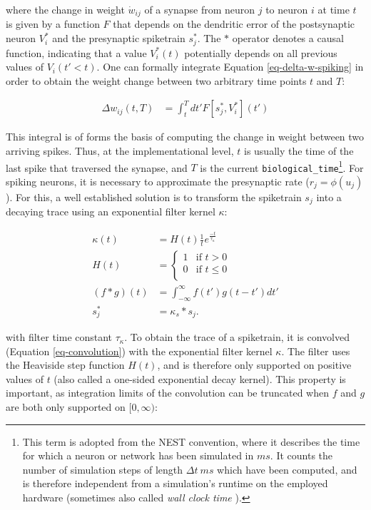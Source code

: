 where the change in weight $\dot{w}_{ij}$ of a synapse from neuron $j$ to neuron $i$ at time $t$ is given by a function
$F$ that depends on the dendritic error of the postsynaptic neuron $V_i^\ast$ and the presynaptic spiketrain $s_j^\ast$.
The $\ast$ operator denotes a causal function, indicating that a value $V_i^\ast(t)$ potentially depends on all previous
values of $V_i(t' < t)$. One can formally integrate Equation \ref{eq-delta-w-spiking} in order to obtain the weight
change between two arbitrary time points $t$ and $T$:

\begin{align}
  \Delta w_{ij}(t,T) & = \int_t^T dt' F[s_j^\ast, V_i^\ast](t') \label{eq-delta-w-t-T}
\end{align}

This integral is of forms the basis of computing the change in weight between two arriving spikes. Thus, at the
implementational level, $t$ is usually the time of the last spike that traversed the synapse, and $T$ is the current
\texttt{biological\_time}\footnote{This term is adopted from the NEST convention, where it describes the time for which
a neuron or network has been simulated in $ms$. It counts the number of simulation steps of length $\Delta t \ ms$ which
have been computed, and is therefore independent from a simulation's runtime  on the employed hardware (sometimes also
called \textit{wall clock time} \citep{albada2018performance}). }. For spiking neurons, it is necessary to approximate
the presynaptic rate ($r_j=\phi(u_j)$). For this, a well established solution is to transform the spiketrain $s_j$ into
a decaying trace using an exponential filter kernel $\kappa$:

\begin{align}
  \kappa(t)     & = H(t) \frac{1}{t}e^{\frac{-t}{\tau_{\kappa}}}                        \\
  H(t)          & =
  \begin{cases}
    1 & \text{if $t > 0$}    \\
    0 & \text{if $t \leq 0$} \\
  \end{cases}                                                              \\
  (f \ast g)(t) & = \int_{- \infty }^{\infty} f(t') g(t-t') d t' \label{eq-convolution} \\
  s_j^\ast      & = \kappa_s \ast s_j. \label{eq-spike-trace}
\end{align}

with filter time constant $\tau_\kappa$. To obtain the trace of a spiketrain, it is convolved (Equation
\ref{eq-convolution}) with the exponential filter kernel $\kappa$. The filter uses the Heaviside step function $H(t)$,
and is therefore only supported on positive values of $t$ (also called a one-sided exponential decay kernel). This
property is important, as integration limits of the convolution can be truncated when $f$ and $g$ are both only
supported on $[0,\infty)$:

